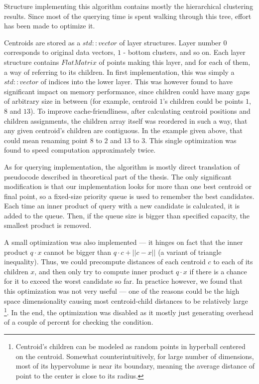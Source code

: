 Structure implementing this algorithm contains mostly the hierarchical clustering results.
Since most of the querying time is spent walking through this tree, effort has been made
to optimize it.

Centroids are stored as a $std::vector$ of layer structures. Layer number $0$ corresponds
to original data vectors, $1$ - bottom clusters, and so on. Each layer structure contains
$FlatMatrix$ of points making this layer, and for each of them, a way of referring to
its children. In first implementation, this was simply a $std::vector$ of indices into
the lower layer. This was however found to have significant impact on memory performance,
since children could have many gaps of arbitrary size in between (for example, centroid
$1$'s children could be points $1$, $8$ and $13$). To improve cache-friendliness, after
calculating centroid positions and children assignments, the children array itself was 
reordered in such a way, that any given centroid's children are contiguous. In the example
given above, that could mean renaming point $8$ to $2$ and $13$ to $3$. This single
optimization was found to speed computation approximately twice.

As for querying implementation, the algorithm is mostly direct translation of pseudocode
described in theoretical part of the thesis. The only significant modification is 
that our implementation looks for more than one best centroid or final point, so a
fixed-size priority queue is used to remember the best candidates. Each time an inner
product of query with a new candidate is calulcated, it is added to the queue.
Then, if the queue size is bigger than specified capacity, the smallest product is
removed.

A small optimization was also implemented --- it hinges on fact that the inner product
$q \cdot x$ cannot be bigger than $q \cdot c + ||c - x||$ (a variant of triangle inequality).
Thus, we could precompute distances of each centroid $c$ to each of its children $x$,
and then only try to compute inner product $q \cdot x$ if there is a chance for 
it to exceed the worst candidate so far. In practice however, we found that this
optimization was not very useful --- one of the reasons could be the high space
dimensionality causing most centroid-child distances to be relatively large \footnote{
Centroid's children can be modeled as random points in hyperball centered on the
centroid. Somewhat counterintuitively, for large number of dimensions, 
most of its hypervolume is near its boundary, meaning the average distance of point
to the center is close to its radius.
}. In the end, the optimization was disabled as it mostly just generating overhead of a
couple of percent for checking the condition.
